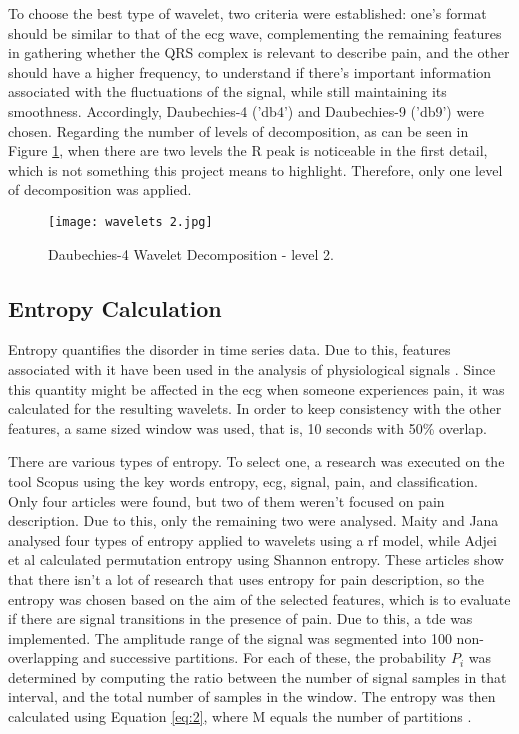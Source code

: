 To choose the best type of wavelet, two criteria were established: one's format should be similar to that of the \ac{ecg} wave, complementing the remaining features in gathering whether the QRS complex is relevant to describe pain, and the other should have a higher frequency, to understand if there's important information associated with the fluctuations of the signal, while still maintaining its smoothness.
Accordingly, Daubechies-4 ('db4') and Daubechies-9 ('db9') were chosen.
Regarding the number of levels of decomposition, as can be seen in Figure \ref{fig:wavelets2}, when there are two levels the R peak is noticeable in the first detail, which is not something this project means to highlight.
Therefore, only one level of decomposition was applied.

\begin{figure}[h!]
    \centering
    \texttt{[image: wavelets 2.jpg]}
    \caption{Daubechies-4 Wavelet Decomposition - level 2.}
    \label{fig:wavelets2}
\end{figure}


\subsection{Entropy Calculation}
Entropy quantifies the disorder in time series data. Due to this, features associated with it have been used in the analysis of physiological signals \cite{Koh2022}. Since this quantity might be affected in the \ac{ecg} when someone experiences pain, it was calculated for the resulting wavelets. In order to keep consistency with the other features, a same sized window was used, that is, 10 seconds with 50\% overlap. %

There are various types of entropy. To select one, a research was executed on the tool Scopus using the key words entropy, ecg, signal, pain, and classification. Only four articles were found, but two of them weren't focused on pain description. Due to this, only the remaining two were analysed. Maity and Jana \cite{Maity2023} analysed four types of entropy applied to wavelets using a \ac{rf} model, while Adjei et al \cite{Adjei2017} calculated permutation entropy using Shannon entropy. These articles show that there isn't a lot of research that uses entropy for pain description, so the entropy was chosen based on the aim of the selected features, which is to evaluate if there are signal transitions in the presence of pain. Due to this, a \ac{tde} was implemented. The amplitude range of the signal was segmented into 100 non-overlapping and successive partitions. For each of these, the probability $P_i$ was determined by computing the ratio between the number of signal samples in that interval, and the total number of samples in the window. The entropy was then calculated using Equation \ref{eq:2}, where M equals the number of partitions \cite{Ferreira2017}.

